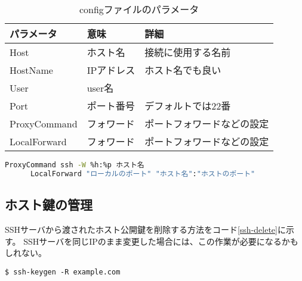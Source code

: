 \documentclass[a4paper,10pt]{jsarticle}
\begin{document}
    \begin{table}[H]
      \centering
        \caption{configファイルのパラメータ}
        \label{conf-pala}
        \begin{tabular}{|l|l|l|}
          \hline
          パラメータ    & 意味        & 詳細  \\
          \hline
          Host        & ホスト名      & 接続に使用する名前    \\
          HostName    & IPアドレス    & ホスト名でも良い      \\
          User        & user名        & \\
          Port        & ポート番号    & デフォルトでは22番    \\
          ProxyCommand  & フォワード  & ポートフォワードなどの設定  \\
          LocalForward  & フォワード  & ポートフォワードなどの設定  \\
          \hline
        \end{tabular}
    \end{table}

    \begin{lstlisting}[caption="ProxyCommand"と"LocalForward",label=portfoward,language=bash]
      ProxyCommand ssh -W %h:%p ホスト名
      LocalForward "ローカルのポート" "ホスト名":"ホストのポート"
    \end{lstlisting}
  
  \subsection{ホスト鍵の管理}
    SSHサーバから渡されたホスト公開鍵を削除する方法をコード\ref{ssh-delete}に示す。
    SSHサーバを同じIPのまま変更した場合には、この作業が必要になるかもしれない。

    \begin{lstlisting}[caption=ホスト鍵の削除,label=ssh-delete]
      $ ssh-keygen -R example.com
    \end{lstlisting}
\end{document}
